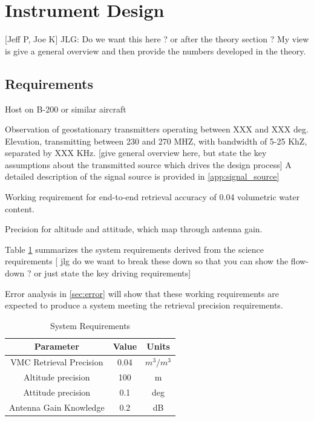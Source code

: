 \documentclass[draftcls,onecolumn]{IEEEtran}  %
\begin{document}
\section{Instrument Design}

[Jeff P, Joe K]
\label{sec:instrument}
JLG: Do we want this here ? or after the theory section ? My view is give a general overview and then provide the numbers developed in the theory. 

\subsection{Requirements}

Host on B-200 or similar aircraft

Observation of geostationary transmitters operating between XXX and XXX deg. Elevation, transmitting between 230 and 270 MHZ, with bandwidth of 5-25 KhZ, separated by XXX KHz. [give general overview here, but state the key assumptions about the transmitted source which drives the design process]  A detailed description of the signal source is provided in \ref{app:signal_source}

Working requirement for end-to-end retrieval accuracy of 0.04 volumetric water content.

Precision for altitude and attitude, which map through antenna gain. 

Table \ref{tab:sysreq} summarizes the system requirements derived from the science requirements [ jlg do we want to break these down so that you can show the flow-down ? or just state the key driving requirements]

Error analysis in \ref{sec:error} will show that these working requirements are expected to produce a system meeting the retrieval precision requirements. 

\begin{table}
\label{tab:sysreq}
\caption{System Requirements}
\begin{tabular}{|c|c|c|}
\hline
Parameter &  Value & Units \\
\hline
VMC Retrieval Precision &  0.04 & $m^3/m^3$ \\
\hline
Altitude precision &  100 & m \\
\hline
Attitude precision & 0.1 & deg \\
\hline 
Antenna Gain Knowledge & 0.2 & dB \\
\hline 
\end{tabular}

\end{table}
\end{document}
